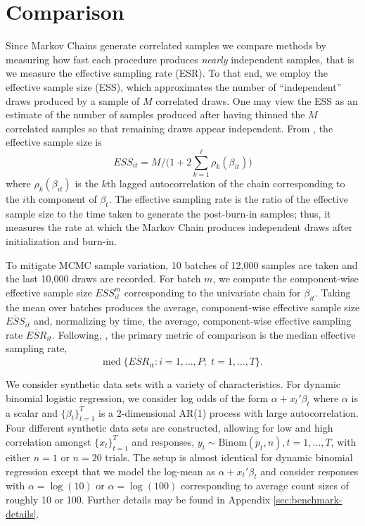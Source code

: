 \documentclass[12pt]{article}
\begin{document}
\section{Comparison}


Since Markov Chains generate correlated samples we compare methods by measuring
how fast each procedure produces \emph{nearly} independent samples, that is we
measure the effective sampling rate (ESR).  To that end, we employ the effective
sample size (ESS), which approximates the number of ``independent'' draws
produced by a sample of $M$ correlated draws.  One may view the ESS as an
estimate of the number of samples produced after having thinned the $M$
correlated samples so that remaining draws appear independent.  From
\cite{holmes-held-2006}, the effective sample size is
\[
ESS_{it} = M / \Big( 1 + 2 \sum_{k=1}^\ell \rho_k(\beta_{it}) \Big)
\]
where $\rho_k(\beta_{it})$ is the $k$th lagged autocorrelation of the chain
corresponding to the $i$th component of $\beta_t$.  The effective
sampling rate is the ratio of the effective sample size to the time taken to
generate the post-burn-in samples; thus, it measures the rate at which the
Markov Chain produces independent draws after initialization and burn-in.

To mitigate MCMC sample variation, 10 batches of 12,000 samples are taken and
the last 10,000 draws are recorded.  For batch $m$, we compute the
component-wise effective sample size $ESS_{it}^{m}$ corresponding to the
univariate chain for $\beta_{it}$.  Taking the mean over batches produces the
average, component-wise effective sample size $\overline{ESS}_{it}$ and,
normalizing by time, the average, component-wise effective sampling rate
$\overline{ESR}_{it}$.  Following, \cite{fruhwirth-schnatter-fruhwirth-2010},
the primary metric of comparison is the median effective sampling rate,
\[
\text{med} \; \Big\{ \overline{ESR}_{it} : i=1, \ldots, P; \;  t=1, \ldots, T \Big\}.
\]

We consider synthetic data sets with a variety of characteristics.
For dynamic binomial logistic regression, we consider log odds of the form
$\alpha + x_t' \beta_t$ where $\alpha$ is a scalar and $\{\beta_t\}_{t=1}^T$ is
a 2-dimensional AR(1) process with large autocorrelation.  Four different
synthetic data sets are constructed, allowing for low and high correlation
amongst $\{x_t\}_{t=1}^T$ and responses, $y_t \sim \text{Binom}(p_t, n), t=1,
\ldots, T$, with either $n=1$ or $n=20$ trials.  The setup is almost identical
for dynamic binomial regression except that we model the log-mean as $\alpha +
x_t' \beta_t$ and consider responses with $\alpha = \log(10)$ or $\alpha =
\log(100)$ corresponding to average count sizes of roughly 10 or 100.  Further
details may be found in Appendix \ref{sec:benchmark-details}.
\end{document}
